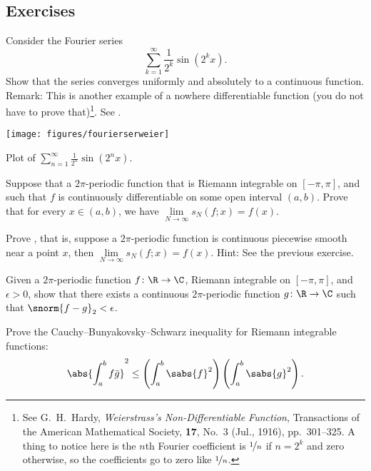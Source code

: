 \subsection{Exercises}

\begin{exercise} \label{exercise:fsweierser}
Consider the Fourier series
\begin{equation*}
\sum_{k=1}^\infty \frac{1}{2^k} \sin(2^k x) .
\end{equation*}
Show that the series converges uniformly and absolutely to a continuous
function.  Remark: This is another example of a nowhere differentiable
function (you do not have to prove that)\footnote{%
See
G.\ H.\ Hardy, \emph{Weierstrass's Non-Differentiable Function},
Transactions of the American Mathematical Society,
\textbf{17}, No.\ 3 (Jul., 1916), pp.\ 301--325.
A thing to notice here is the $n$th Fourier coefficient is $\nicefrac{1}{n}$
if $n=2^k$ and zero otherwise, so the coefficients go to zero like
$\nicefrac{1}{n}$.}.
See .
\begin{myfigureht}
\texttt{[image: figures/fourierserweier]}
\caption{Plot of 
$\sum_{n=1}^\infty \frac{1}{2^n} \sin(2^n x)$.\label{fig:fourierserweier}}
\end{myfigureht}
\end{exercise}

\begin{exercise}
Suppose that a $2\pi$-periodic function that is Riemann integrable
on $[-\pi,\pi]$, and such that $f$ is continuously differentiable
on some open interval $(a,b)$.  Prove that
for every $x \in (a,b)$, we have $\lim\limits_{N\to\infty} s_N(f;x) = f(x)$.
\end{exercise}

\begin{exercise}
Prove , that is,
suppose a $2\pi$-periodic function is continuous piecewise
smooth near a point $x$, then $\lim\limits_{N\to\infty} s_N(f;x) = f(x)$.  Hint: See the previous
exercise.
\end{exercise}

\begin{exercise}
Given a $2\pi$-periodic function $f \colon \R \to \C$, Riemann integrable on
$[-\pi,\pi]$,
and $\epsilon > 0$,
show that there exists a continuous $2\pi$-periodic function $g \colon \R
\to \C$ such that $\snorm{f-g}_2 < \epsilon$.
\end{exercise}

\begin{exercise}
Prove the Cauchy--Bunyakovsky--Schwarz inequality
for Riemann integrable functions:
\begin{equation*}
{\abs{\int_a^b f\bar{g}}}^2
\leq
\left( \int_a^b \sabs{f}^2 \right)
\left( \int_a^b \sabs{g}^2 \right) .
\end{equation*}
\end{exercise}

